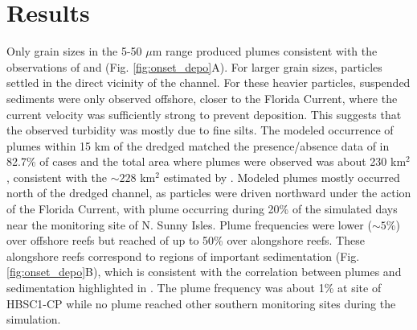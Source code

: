 \section{Results}

Only grain sizes in the 5-50 $\mu$m range produced plumes consistent with the observations of \cite{barnes2015sediment} and \cite{cunning2019extensive} (Fig. \ref{fig:onset_depo}A). For larger grain sizes, particles settled in the direct vicinity of the channel. For these heavier particles, suspended sediments were only observed offshore, closer to the Florida Current, where the current velocity was sufficiently strong to prevent deposition. This suggests that the observed turbidity was mostly due to fine silts. The modeled occurrence of plumes within 15 km of the dredged matched the presence/absence data of \cite{cunning2019extensive} in 82.7\% of cases and the total area where plumes were observed was about 230 km$^2$, consistent with the $\sim228$ km$^2$ estimated by \cite{barnes2015sediment}. Modeled plumes mostly occurred north of the dredged channel, as particles were driven northward under the action of the Florida Current, with plume occurring during 20\% of the simulated days near the monitoring site of N. Sunny Isles. Plume frequencies were lower ($\sim 5$\%) over offshore reefs but reached of up to 50\% over alongshore reefs. These alongshore reefs correspond to regions of important sedimentation (Fig. \ref{fig:onset_depo}B), which is consistent with the correlation between plumes and sedimentation highlighted in \cite{cunning2019extensive}. The plume frequency was about 1\% at site of HBSC1-CP while no plume reached other southern monitoring sites during the simulation. 


